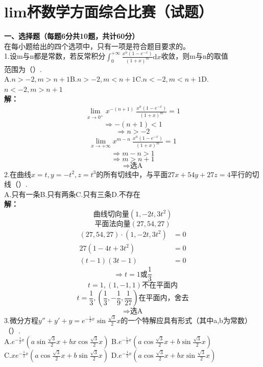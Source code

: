 \documentclass[a4paper]{article}
\begin{document}
\newpage
{\centering\section*{lim杯数学方面综合比赛（试题）}}
\noindent
\textbf{一、选择题（每题6分共10题，共计60分）}\\
在每小题给出的四个选项中，只有一项是符合题目要求的。\\
1.设m与n都是常数，若反常积分$\int_{0}^{+\infty} \frac{x^n(1-e^{-x})}{(1+x)^{m}}\mathrm{d}x$收敛，则m与n的取值\\
范围为（\quad）.\\
A.$n>-2,m>n+1$\quad B.$n>-2,m<n+1$\quad C.$n<-2,m<n+1$\quad D.$n<-2,m>n+1$\\
\textbf{解：}
\begin{align*}
	\lim \limits_{x \to 0^{+}} x^{-(n+1)}\: \frac{x^n(1-e^{-x})}{(1+x)^m}=1
\end{align*}
$$\Rightarrow -(n+1)<1$$
$$\Rightarrow n>-2$$
\begin{align*}
	\lim \limits_{x \to +\infty} x^{m-n}\:\frac{x^n(1-e^{-x})}{(1+x)^m}=1
\end{align*}
$$\Rightarrow m-n>1$$
$$\Rightarrow m>n+1$$
$$\Rightarrow \text{选A}$$
2.在曲线$x=t,y=-t^2,z=t^3$的所有切线中，与平面$27x+54y+27z=4$平行的切线（\quad）.\\
A.只有一条\hfill B.只有两条\hfill C.只有三条\hfill D.不存在\\
\textbf{解：}
$$\text{曲线切向量}(1,-2t,3t^2)$$
$$\text{平面法向量}(27,54,27)$$
\begin{align*}
	(27,54,27)\cdot (1,-2t,3t^2) &=0\\
	27(1-4t+3t^2)&=0\\
	(t-1)(3t-1)&=0
\end{align*}
$$\Rightarrow t=1\text{或}\frac{1}{3}$$
$$t=1,(1,-1,1)\text{不在平面内}$$
$$t=\frac{1}{3},(\frac{1}{3},-\frac{1}{9},\frac{1}{27})\text{在平面内，舍去}$$
$$\Rightarrow \text{选A}$$
\newpage
\noindent
3.微分方程$y''+y'+y=e^{-\frac{1}{2}x}\sin \frac{\sqrt{3}}{2}x$的一个特解应具有形式（其中a,b为常数）（\quad）.\\
A.$e^{-\frac{1}{2}x}\left(a\sin \frac{\sqrt{3}}{2}x + bx\cos\frac{\sqrt{3}}{2}x \right)$\hfill
B.$e^{-\frac{1}{2}x}\left(a\cos \frac{\sqrt{3}}{2}x + b\sin\frac{\sqrt{3}}{2}x \right)$\\
C.$xe^{-\frac{1}{2}x}\left(a\cos \frac{\sqrt{3}}{2}x + b\sin\frac{\sqrt{3}}{2}x \right)$\hfill
D.$e^{-\frac{1}{2}x}\left(a\cos \frac{\sqrt{3}}{2}x + bx\sin\frac{\sqrt{3}}{2}x \right)$\\
\end{document}
